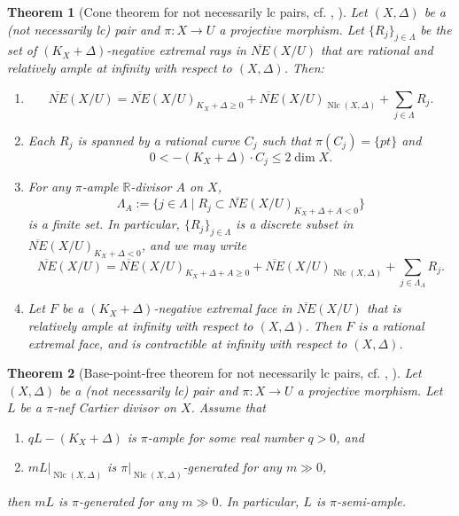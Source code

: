 \documentclass[11pt]{amsart}
\numberwithin{equation}{section}
\newcommand{\Rr}{\mathbb{R}}
\newcommand{\Nlc}{\operatorname{Nlc}}
\newtheorem{thm}{Theorem}[section]
\theoremstyle{definition}
\theoremstyle{definition}
\theoremstyle{definition}
\begin{document}
\begin{thm}[Cone theorem for not necessarily lc pairs, {cf. \cite[Theorem 5.10]{Amb03}, \cite[Theorems 4.5.2, 6.7.4]{Fuj11}}]\label{thm: cone theorem for not necessarily lc pairs}
Let $(X,\Delta)$ be a (not necessarily lc) pair and $\pi: X\rightarrow U$ a projective morphism. Let $\{R_j\}_{j\in\Lambda}$ be the set of $(K_X+\Delta)$-negative extremal rays in $\overline{NE}(X/U)$ that are rational and relatively ample at infinity with respect to $(X,\Delta)$. Then:
\begin{enumerate}
    \item $$\overline{NE}(X/U)=\overline{NE}(X/U)_{K_X+\Delta\geq 0}+\overline{NE}(X/U)_{\Nlc(X,\Delta)}+\sum_{j\in\Lambda} R_j.$$
    \item Each $R_j$ is spanned by a rational curve $C_j$ such that $\pi(C_j)=\{pt\}$ and $$0<-(K_X+\Delta)\cdot C_j\leq 2\dim X.$$
    \item For any $\pi$-ample $\Rr$-divisor $A$ on $X$, 
    $$\Lambda_A:=\{j\in\Lambda\mid R_j\subset\overline{NE}(X/U)_{K_X+\Delta+A<0}\}$$
    is a finite set. In particular, $\{R_j\}_{j\in\Lambda}$ is a discrete subset in $\overline{NE}(X/U)_{K_X+\Delta<0}$, and we may write
    $$\overline{NE}(X/U)=\overline{NE}(X/U)_{K_X+\Delta+A\geq 0}+\overline{NE}(X/U)_{\Nlc(X,\Delta)}+\sum_{j\in\Lambda_A}R_j.$$
    \item Let $F$ be a $(K_X+\Delta)$-negative extremal face in $\overline{NE}(X/U)$ that is relatively ample at infinity with respect to $(X,\Delta)$. Then $F$ is a rational extremal face, and is contractible at infinity with respect to $(X,\Delta)$.
\end{enumerate}
\end{thm}

\begin{thm}[Base-point-free theorem for not necessarily lc pairs, {cf. \cite[Theorem 5.3]{Amb03}, \cite[Theorems 4.5.5, 6.5.1]{Fuj11}}]\label{thm: base-point-free theorem for not necessarily lc pairs}
Let $(X,\Delta)$ be a (not necessarily lc) pair and $\pi: X\rightarrow U$ a projective morphism. Let $L$ be a $\pi$-nef Cartier divisor on $X$. Assume that
\begin{enumerate}
    \item $qL-(K_X+\Delta)$ is $\pi$-ample for some real number $q>0$, and
    \item $mL|_{\Nlc(X,\Delta)}$ is $\pi|_{\Nlc(X,\Delta)}$-generated for any $m\gg 0$,
\end{enumerate}
then $mL$ is $\pi$-generated for any $m\gg 0$. In particular, $L$ is $\pi$-semi-ample.
\end{thm}
\end{document}
